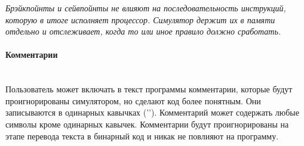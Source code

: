 { \it \large
Брэйкпойнты и сейвпойнты не влияют на последовательность инструкций, которую в итоге исполняет процессор. Симулятор держит их в памяти отдельно и отслеживает, когда то или иное правило должно сработать.
}
\paragraph{Комментарии}~\\
Пользователь может включать в текст программы комментарии, которые будут проигнорированы симулятором, но сделают код более понятным. Они записываются в одинарных кавычках ('\space'). Комментарий может содержать любые символы кроме одинарных кавычек.
Комментарии будут проигнорированы на этапе перевода текста в бинарный код и никак не повлияют на программу.


